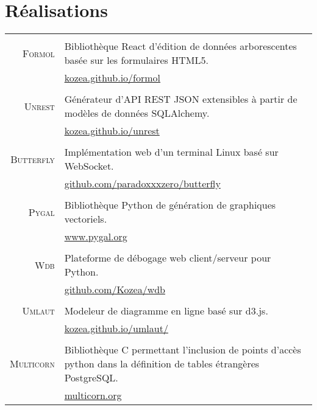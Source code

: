 \documentclass[a4paper,10pt]{article}
\begin{document}
  \section{Réalisations}
  \begin{tabular}{r|p{11cm}}
    \multicolumn{2}{c}{} \\
    \textsc{Formol}
      & Bibliothèque React d’édition de données arborescentes basée sur les formulaires HTML5. \\
      & \href{https://kozea.github.io/formol/}{kozea.github.io/formol} \\

    \multicolumn{2}{c}{} \\
    \textsc{Unrest}
      & Générateur d'API REST JSON extensibles à partir de modèles de données SQLAlchemy. \\
      & \href{https://kozea.github.io/unrest/}{kozea.github.io/unrest} \\

    \multicolumn{2}{c}{} \\
    \textsc{Butterfly}
      & Implémentation web d'un terminal Linux basé sur WebSocket. \\
      & \href{https://github.com/paradoxxxzero/butterfly}{github.com/paradoxxxzero/butterfly} \\

    \multicolumn{2}{c}{} \\
    \textsc{Pygal}
      & Bibliothèque Python de génération de graphiques vectoriels. \\
      & \href{http://www.pygal.org/}{www.pygal.org} \\

    \multicolumn{2}{c}{} \\
    \textsc{Wdb}
      & Plateforme de débogage web client/serveur pour Python. \\
      & \href{https://github.com/Kozea/wdb}{github.com/Kozea/wdb} \\

    \multicolumn{2}{c}{} \\
    \textsc{Umlaut}
      & Modeleur de diagramme en ligne basé sur d3.js. \\
      & \href{http://kozea.github.io/umlaut/}{kozea.github.io/umlaut/} \\

    \multicolumn{2}{c}{} \\
    \textsc{Multicorn}
      & Bibliothèque C permettant l’inclusion de points d'accès python dans la définition de tables étrangères PostgreSQL. \\
      & \href{https://multicorn.org/}{multicorn.org} \\


\end{tabular}
\end{document}
